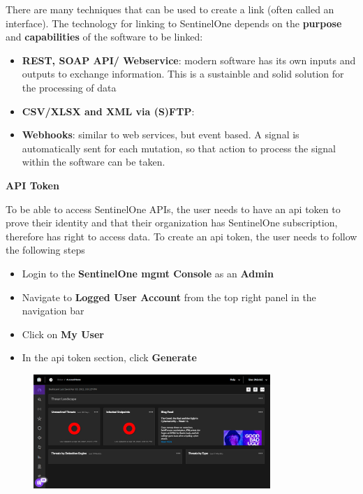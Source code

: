 \begin{multicols}{2}
      There are many techniques that can be used to create a link (often called an interface). The technology for linking to
      SentinelOne depends on the \textbf{purpose} and \textbf{capabilities} of the software to be linked:
      \begin{itemize}
            \item \textbf{REST, SOAP API/ Webservice}: modern software has its own inputs and outputs to exchange information.
                  This is a sustainble and solid solution for the processing of data
            \item \textbf{CSV/XLSX and XML via (S)FTP}:
            \item \textbf{Webhooks}: similar to web services, but event based. A signal is automatically sent for each mutation,
                  so that action to process the signal within the software can be taken.
      \end{itemize}

      \textbf{API Token}

      To be able to access SentinelOne APIs, the user needs to have an \acrshort{api} token to prove their identity and that their
      organization has SentinelOne subscription, therefore has right to access data. To create an \acrshort{api} token, the user needs
      to follow the following steps

      \begin{itemize}
            \item Login to the \textbf{SentinelOne \acrshort{mgmt} Console} as an \textbf{Admin}
            \item Navigate to \textbf{Logged User Account} from the top right panel in the navigation bar
            \item Click on \textbf{My User}
            \item In the \acrshort{api} token section, click \textbf{Generate}
      \end{itemize}
\end{multicols}

\begin{figure}[htbp]
      \centering
      \includegraphics[width=0.8\textwidth]{Figures/SentinelOne/login admin.png}
\end{figure}


